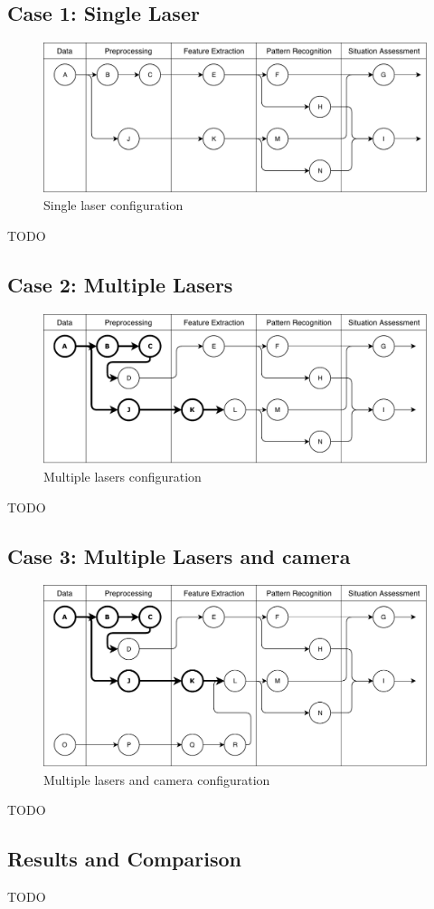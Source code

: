 \subsection{Case 1: Single Laser}

\begin{figure}[ht!]
\centering
\includegraphics[scale=0.7]{fig/4/test_configuration1.pdf}
\caption{Single laser configuration}
\label{tconf1}
\end{figure}

TODO


\subsection{Case 2: Multiple Lasers}

\begin{figure}[ht!]
\centering
\includegraphics[scale=0.7]{fig/4/test_configuration2.pdf}
\caption{Multiple lasers configuration}
\label{tconf2}
\end{figure}

TODO

\subsection{Case 3: Multiple Lasers and camera}

\begin{figure}[ht!]
\centering
\includegraphics[scale=0.7]{fig/4/test_configuration3.pdf}
\caption{Multiple lasers and camera configuration}
\label{tconf3}
\end{figure}

TODO

\subsection{Results and Comparison}

TODO